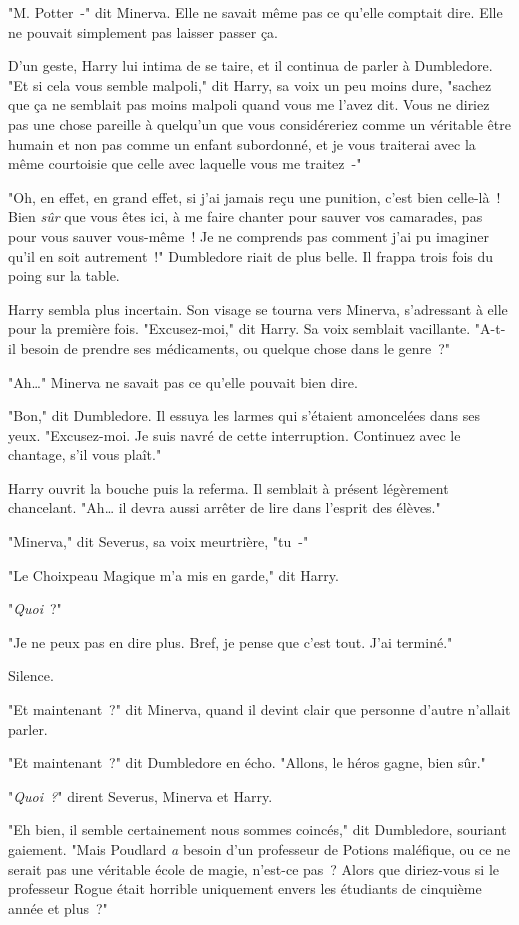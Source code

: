 "M. Potter~-" dit Minerva. Elle ne savait même pas ce qu'elle comptait dire. Elle ne pouvait simplement pas laisser passer ça.

D'un geste, Harry lui intima de se taire, et il continua de parler à Dumbledore. "Et si cela vous semble malpoli," dit Harry, sa voix un peu moins dure, "sachez que ça ne semblait pas moins malpoli quand vous me l'avez dit. Vous ne diriez pas une chose pareille à quelqu'un que vous considéreriez comme un véritable être humain et non pas comme un enfant subordonné, et je vous traiterai avec la même courtoisie que celle avec laquelle vous me traitez~-"

"Oh, en effet, en grand effet, si j'ai jamais reçu une punition, c'est bien celle-là~! Bien \emph{sûr} que vous êtes ici, à me faire chanter pour sauver vos camarades, pas pour vous sauver vous-même~! Je ne comprends pas comment j'ai pu imaginer qu'il en soit autrement~!" Dumbledore riait de plus belle. Il frappa trois fois du poing sur la table.

Harry sembla plus incertain. Son visage se tourna vers Minerva, s'adressant à elle pour la première fois. "Excusez-moi," dit Harry. Sa voix semblait vacillante. "A-t-il besoin de prendre ses médicaments, ou quelque chose dans le genre~?"

"Ah…" Minerva ne savait pas ce qu'elle pouvait bien dire.

"Bon," dit Dumbledore. Il essuya les larmes qui s'étaient amoncelées dans ses yeux. "Excusez-moi. Je suis navré de cette interruption. Continuez avec le chantage, s'il vous plaît."

Harry ouvrit la bouche puis la referma. Il semblait à présent légèrement chancelant. "Ah… il devra aussi arrêter de lire dans l'esprit des élèves."

"Minerva," dit Severus, sa voix meurtrière, "tu~-"

"Le Choixpeau Magique m'a mis en garde," dit Harry.

"\emph{Quoi}~?"

"Je ne peux pas en dire plus. Bref, je pense que c'est tout. J'ai terminé."

Silence.

"Et maintenant~?" dit Minerva, quand il devint clair que personne d'autre n'allait parler.

"Et maintenant~?" dit Dumbledore en écho. "Allons, le héros gagne, bien sûr."

"\emph{Quoi~?}" dirent Severus, Minerva et Harry.

"Eh bien, il semble certainement nous sommes coincés," dit Dumbledore, souriant gaiement. "Mais Poudlard \emph{a} besoin d'un professeur de Potions maléfique, ou ce ne serait pas une véritable école de magie, n'est-ce pas~? Alors que diriez-vous si le professeur Rogue était horrible uniquement envers les étudiants de cinquième année et plus~?"

